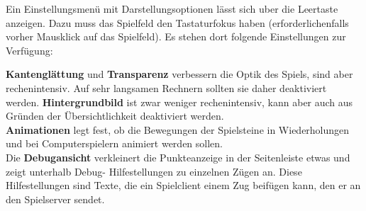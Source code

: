 \documentclass{scrartcl}
\begin{document}
	Ein Einstellungsmenü mit Darstellungsoptionen lässt
sich uber die Leertaste anzeigen. Dazu muss das
Spielfeld den Tastaturfokus haben (erforderlichenfalls
vorher Mausklick auf das Spielfeld). Es stehen dort
folgende Einstellungen zur Verfügung:

\textbf{Kantenglättung} und \textbf{Transparenz} verbessern die
Optik des Spiels, sind aber rechenintensiv. Auf sehr
langsamen Rechnern sollten sie daher deaktiviert
werden. \textbf{Hintergrundbild} ist zwar weniger rechenintensiv, kann
aber auch aus Gründen der Übersichtlichkeit deaktiviert
werden.\\
\textbf{Animationen} legt fest, ob die Bewegungen der Spielsteine in Wiederholungen und bei Computerspielern
animiert werden sollen.\\
Die \textbf{Debugansicht} verkleinert die Punkteanzeige in
der Seitenleiste etwas und zeigt unterhalb Debug-
Hilfestellungen zu einzelnen Zügen an. Diese Hilfestellungen sind Texte, die ein Spielclient einem Zug
beifügen kann, den er an den Spielserver sendet.
	
\end{document}

